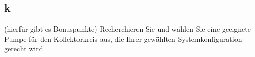 \subsection{k}
(hierfür gibt es Bonuspunkte)
Recherchieren Sie und wählen Sie eine geeignete Pumpe für den Kollektorkreis aus, die Ihrer gewählten
Systemkonfiguration gerecht wird